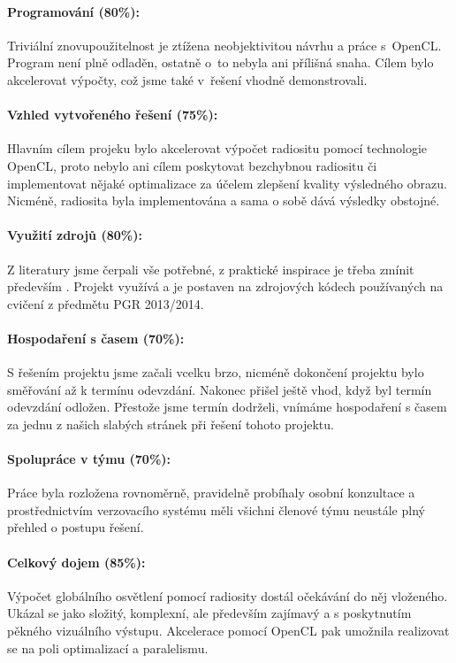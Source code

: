 \documentclass[11pt,a4paper]{article}
\begin{document}
\paragraph{Programování (80\%):}
Triviální znovupoužitelnost je ztížena neobjektivitou návrhu a práce s~OpenCL. Program není plně odladěn, ostatně o~to nebyla ani přílišná snaha. Cílem bylo akcelerovat výpočty, což jsme také v~řešení vhodně demonstrovali. 

\paragraph{Vzhled vytvořeného řešení (75\%):}
Hlavním cílem projeku bylo akcelerovat výpočet radiositu pomocí technologie OpenCL, proto nebylo ani cílem poskytovat bezchybnou radiositu či implementovat nějaké optimalizace za účelem zlepšení kvality výsledného obrazu. Nicméně, radiosita byla implementována a sama o sobě dává výsledky obstojné.

\paragraph{Využití zdrojů (80\%):}
Z literatury jsme čerpali vše potřebné, z praktické inspirace je třeba zmínit především \cite{sabata}. Projekt využívá a je postaven na zdrojových kódech používaných na cvičení z předmětu PGR 2013/2014.

\paragraph{Hospodaření s časem (70\%):}
S řešením projektu jsme začali vcelku brzo, nicméně dokončení projektu bylo směřování až k termínu odevzdání. Nakonec přišel ještě vhod, když byl termín odevzdání odložen. Přestože jsme termín dodrželi, vnímáme hospodaření s časem za jednu z našich slabých stránek při řešení tohoto projektu.

\paragraph{Spolupráce v týmu (70\%):}
Práce byla rozložena rovnoměrně, pravidelně probíhaly osobní konzultace a prostřednictvím verzovacího systému měli všichni členové týmu neustále plný přehled o postupu řešení.

\paragraph{Celkový dojem (85\%):}
Výpočet globálního osvětlení pomocí radiosity dostál očekávání do něj vloženého. Ukázal se jako složitý, komplexní, ale především zajímavý a s poskytnutím pěkného vizuálního výstupu. Akcelerace pomocí OpenCL pak umožnila realizovat se na poli optimalizací a paralelismu.
\end{document}
